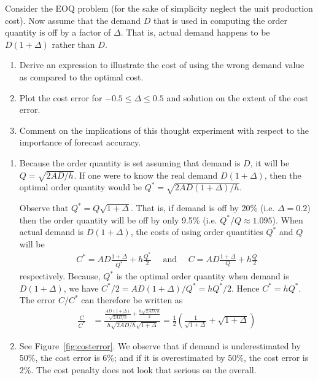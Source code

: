 \begin{exercise}
Consider the EOQ problem (for the sake of simplicity neglect the unit production cost). Now assume that the demand $D$ that is used in computing the order quantity is off by a factor of $\Delta$. That is, actual demand happens to be $D(1+\Delta)$ rather than $D$. 
\begin{enumerate}
\item Derive an expression to illustrate the cost of using the wrong demand value as compared to the optimal cost. 
\item Plot the cost error for $-0.5\leq \Delta\leq 0.5$ and solution on the extent of the cost error.
\item Comment on the implications of this thought experiment with respect to the importance of forecast accuracy.
\end{enumerate}


  \begin{solution}
\begin{enumerate}
\item Because the order quantity is set assuming that demand is $D$, it will be $Q=\sqrt{2AD/h}$. If one were to know the real demand $D(1+\Delta)$, then the optimal order quantity would be $Q^*=\sqrt{2AD(1+\Delta)/h}$. 

Observe that  $Q^*=Q\sqrt{1+\Delta}$. That is, if demand is off by 20\% (i.e. $\Delta=0.2$) then the order quantity will be off by only 9.5\% (i.e. $Q^*/Q\approx 1.095$). When actual demand is $D(1+\Delta)$, the costs of using order quantities $Q^*$ and $Q$ will be 
\begin{align*}
C^* = AD\frac{1+\Delta}{Q^*} + h\frac{Q^*}{2} \quad \text{ and } \quad C = AD\frac{1+\Delta}{Q}+h\frac{Q}{2}
\end{align*}
respectively. Because, $Q^*$ is the optimal order quantity when demand is $D(1+\Delta)$, we have $C^*/2=AD(1+\Delta)/Q^*=hQ^*/2$. Hence $C^*=hQ^*$. The error $C/C^*$ can therefore be written as
\begin{align*}
\frac{C}{C^*} 
& = \frac{\frac{AD (1+\Delta)}{\sqrt{2AD/h}}+\frac{h\sqrt{2AD/h}}{2}}{h\sqrt{2AD/h}\sqrt{1+\Delta}} = \frac{1}{2}\left(\frac{1}{\sqrt{1+\Delta}} + \sqrt{1+\Delta}\right)
\end{align*}
\item See Figure~\ref{fig:costerror}. We observe that if demand is underestimated by 50\%, the cost error is 6\%; and if it is overestimated by 50\%, the cost error is 2\%. The cost penalty does not look that serious on the overall.


\end{enumerate}
\end{solution}
\end{exercise}
